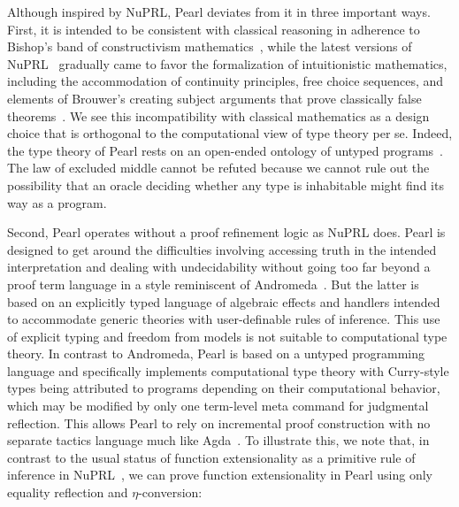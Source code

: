 \documentclass[a4paper]{article}
\begin{document}

Although inspired by NuPRL, Pearl deviates from it in three important ways. First, it is intended to be consistent with classical reasoning in adherence to Bishop's band of constructivism mathematics~\cite{bishop1967foundations}, while the latest versions of NuPRL~\cite{rahli2017bar, bickford2018computability, constable2020continuum} gradually came to favor the formalization of intuitionistic mathematics, including the accommodation of continuity principles, free choice sequences, and elements of Brouwer's creating subject arguments that prove classically false theorems~\cite{bentzen2025iep}. We see this incompatibility with classical mathematics as a design choice that is orthogonal to the computational view of type theory per se. Indeed, the type theory of Pearl rests on an open-ended ontology of untyped programs~\cite[\S11]{bentzen2026book}. The law of excluded middle cannot be refuted because we cannot rule out the possibility that an oracle deciding whether any type is inhabitable might find its way as a program. 

Second, Pearl operates without a proof refinement logic as NuPRL does. Pearl is designed to get around the difficulties involving accessing truth in the intended interpretation and dealing with undecidability without going too far beyond a proof term language in a style reminiscent of Andromeda~\cite{bauer2018design}. But the latter is based on an explicitly typed language of algebraic effects and handlers intended to accommodate generic theories with user-definable rules of inference. This use of explicit typing and freedom from models is not suitable to computational type theory. In contrast to Andromeda, Pearl is based on a untyped programming language and specifically implements computational type theory with Curry-style types being attributed to programs depending on their computational behavior, which may be modified by only one term-level meta command for judgmental reflection. This allows Pearl to rely on incremental proof construction with no separate tactics language much like Agda~\cite{norell2009agda}. 
To illustrate this, we note that, in contrast to the usual status of function extensionality as a primitive rule of inference in NuPRL~\cites[p.~179]{nuprl}[A.3.1]{kreitz2002nuprl}, we can prove function extensionality in Pearl using only equality reflection and $\eta$-conversion:

\end{document}
